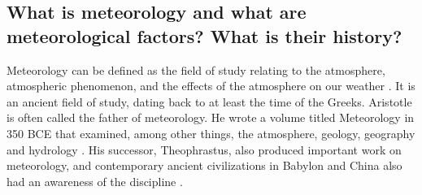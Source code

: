 

\subsection{What is meteorology and what are meteorological factors? What is their history?}






Meteorology can be defined as the field of study relating to the atmosphere, atmospheric phenomenon, and the effects of the atmosphere on our weather \citep{natgeodef}. It is an ancient field of study, dating back to at least the time of the Greeks. Aristotle is often called the father of meteorology. He wrote a volume titled Meteorology in 350 BCE that examined, among other things, the atmosphere, geology, geography and hydrology \citep{aristotle}. His successor, Theophrastus, also produced important work on meteorology, and contemporary ancient civilizations in Babylon and China also had an awareness of the discipline \citep{meteopastpresent}. 

